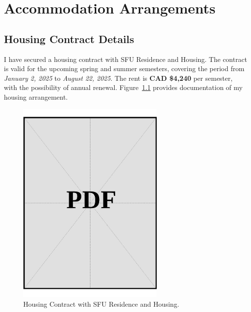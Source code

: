 \chapter{Accommodation Arrangements}
\label{sec:housing-proof}

\section{Housing Contract Details}
\label{sec:sfu-housing-contract}

\noindent
I have secured a housing contract with SFU Residence and Housing. The contract is valid for the upcoming spring and summer semesters, covering the period from \textit{January 2, 2025} to \textit{August 22, 2025}. The rent is \textbf{CAD \$4,240} per semester, with the possibility of annual renewal. Figure~\ref{fig:sfu-housing-contract} provides documentation of my housing arrangement.

\vspace*{\fill}
\begin{figure}[ht]
    \centering
    \includegraphics[page=1,width=0.65\textwidth]{../application-docs/applicant/proof-of-housing-arrangement/contract.pdf}
    \caption{Housing Contract with SFU Residence and Housing.}
    \label{fig:sfu-housing-contract}
\end{figure}
\vspace*{\fill}
\clearpage

